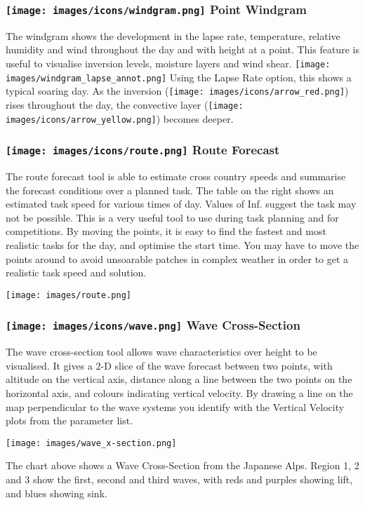 \documentclass[9pt,a4paper,twocolumn]{article}
\begin{document}
\subsubsection*{\texttt{[image: images/icons/windgram.png]} Point Windgram}
The windgram shows the development in the lapse rate, temperature, relative humidity and wind throughout the day and with height at a point. This feature is useful to visualise inversion levels, moisture layers and wind shear.
\texttt{[image: images/windgram\_lapse\_annot.png]}
Using the Lapse Rate option, this shows a typical soaring day. As the inversion (\texttt{[image: images/icons/arrow\_red.png]}) rises throughout the day, the convective layer (\texttt{[image: images/icons/arrow\_yellow.png]}) becomes deeper.
\subsubsection*{\texttt{[image: images/icons/route.png]} Route Forecast}
The route forecast tool is able to estimate cross country speeds and summarise the forecast conditions over a planned task. The table on the right shows an estimated task speed for various times of day. Values of Inf. suggest the task may not be possible. This is a very useful tool to use during task planning and for competitions. By moving the points, it is easy to find the fastest and most realistic tasks for the day, and optimise the start time. You may have to move the points around to avoid unsoarable patches in complex weather in order to get a realistic task speed and solution.

\texttt{[image: images/route.png]}
\subsubsection*{\texttt{[image: images/icons/wave.png]} Wave Cross-Section}
The wave cross-section tool allows wave characteristics over height to be visualised. It gives a 2-D slice of the wave forecast between two points, with altitude on the vertical axis, distance along a line between the two points on the horizontal axis, and colours indicating vertical velocity. By drawing a line on the map perpendicular to the wave systems you identify with the Vertical Velocity plots from the parameter list.

\texttt{[image: images/wave\_x-section.png]}

The chart above shows a Wave Cross-Section from the Japanese Alps. Region 1, 2 and 3 show the first, second and third waves, with reds and purples showing lift, and blues showing sink.
\end{document}

